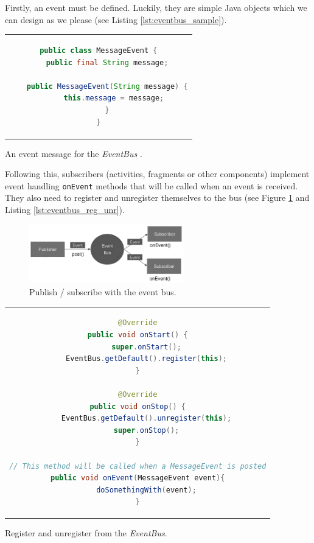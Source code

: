 \documentclass[a4paper, oneside, 11pt]{book}
\begin{document}
Firstly, an event must be defined. Luckily, they are simple Java objects which we can design as we please (see Listing \ref{lst:eventbus_sample}).\\

\begin{listing}[!h]
	\centering
	\begin{tabular}{c}
		\begin{lstlisting}[language=java]
public class MessageEvent {
    public final String message;

    public MessageEvent(String message) {
       this.message = message;
    }
}
		\end{lstlisting}
	\end{tabular}
	\caption{An event message for the \textit{EventBus}  \cite{Eventbusslide:online}.}
	\label{lst:eventbus_sample}
\end{listing}

Following this, subscribers (activities, fragments or other components) implement event handling \texttt{onEvent} methods that will be called when an event is received. They also need to register and unregister themselves to the bus (see Figure \ref{fig:publish_subscribe} and Listing \ref{lst:eventbus_reg_unr}).

\begin{figure}[htbp]
	\centerline{\includegraphics[width=0.6\textwidth]{publish_subscribe.png}}
	\caption{Publish / subscribe with the event bus.}
	\label{fig:publish_subscribe}
\end{figure}

\begin{listing}[!h]
	\centering
	\begin{tabular}{c}
		\begin{lstlisting}[language=java]    
@Override
public void onStart() {
    super.onStart();
    EventBus.getDefault().register(this);
}

@Override
public void onStop() {
    EventBus.getDefault().unregister(this);
    super.onStop();
}

// This method will be called when a MessageEvent is posted
public void onEvent(MessageEvent event){
    doSomethingWith(event);
}
		\end{lstlisting}    
 	\end{tabular}
	\caption{Register and unregister from the \textit{EventBus}.}
	\label{lst:eventbus_reg_unr}
\end{listing}
\end{document}
